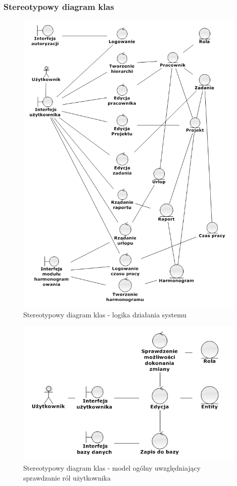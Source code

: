 \subsubsection{Stereotypowy diagram klas}
\begin{adjustwidth}{5em}{0pt}

\begin{figure}[H]
    \centering
    \includegraphics[scale=0.8]{diagramy/modelKlas/Robustnessdiagram1.png}
    \caption{Stereotypowy diagram klas - logika działania systemu}
    \label{fig:logika}
\end{figure}

\begin{figure}[H]
    \centering
    \includegraphics[scale=0.8]{diagramy/modelKlas/Robustnessdiagram2.png}
    \caption{Stereotypowy diagram klas - model ogólny uwzględniający sprawdzanie ról użytkownika}
    \label{fig:ogolny}
\end{figure}

\end{adjustwidth}
